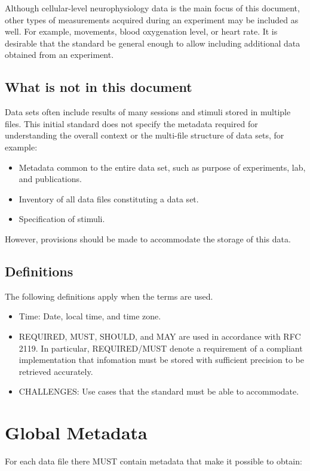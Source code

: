 \documentclass[letterpaper, 10 pt, conference]{ieeeconf}  \IEEEoverridecommandlockouts                              \overrideIEEEmargins
\begin{document}
Although cellular-level neurophysiology data is the main focus of this document, other types of measurements acquired during an experiment may be included as well.  
For example, movements, blood oxygenation level, or heart rate.  
It is desirable that the standard be general enough to allow including additional data obtained from an experiment.

\subsection{What is not in this document}
Data sets often include results of many sessions and stimuli stored in multiple files.  
This initial standard does not specify the metadata required for understanding the overall context or the multi-file structure of data sets, for example:

\begin{itemize}
\item Metadata common to the entire data set, such as purpose of experiments, lab, and publications.
\item Inventory of all data files constituting a data set.
\item Specification of stimuli.
\end{itemize}

However, provisions should be made to accommodate the storage of this data.  

\subsection{Definitions}
The following definitions apply when the terms are used.

\begin{itemize}
\item Time: Date, local time, and time zone.  
\item REQUIRED, MUST, SHOULD, and MAY are used in accordance with RFC 2119. In particular, REQUIRED/MUST denote a requirement of a compliant implementation that infomation must be stored with sufficient precision to be retrieved accurately.
\item CHALLENGES: Use cases that the standard must be able to accommodate.
\end{itemize}

\medskip
\section{\textbf{Global Metadata}}
For each data file there MUST contain metadata that make it possible to obtain:
\end{document}
